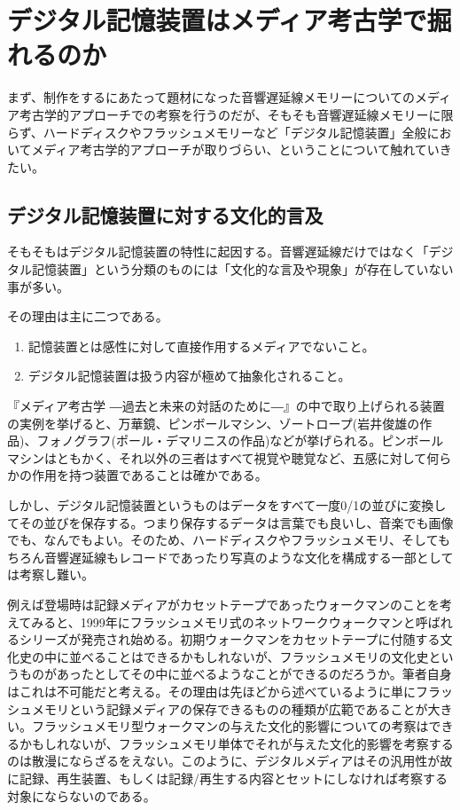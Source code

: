 \documentclass[a4paper,report]{jsbook}
\begin{document}
\section{デジタル記憶装置はメディア考古学で掘れるのか}\label{ux30c7ux30b8ux30bfux30ebux8a18ux61b6ux88c5ux7f6eux306fux30e1ux30c7ux30a3ux30a2ux8003ux53e4ux5b66ux3067ux6398ux308cux308bux306eux304b}

まず、制作をするにあたって題材になった音響遅延線メモリーについてのメディア考古学的アプローチでの考察を行うのだが、そもそも音響遅延線メモリーに限らず、ハードディスクやフラッシュメモリーなど「デジタル記憶装置」全般においてメディア考古学的アプローチが取りづらい、ということについて触れていきたい。

\subsection{デジタル記憶装置に対する文化的言及}\label{ux30c7ux30b8ux30bfux30ebux8a18ux61b6ux88c5ux7f6eux306bux5bfeux3059ux308bux6587ux5316ux7684ux8a00ux53ca}

そもそもはデジタル記憶装置の特性に起因する。音響遅延線だけではなく「デジタル記憶装置」という分類のものには「文化的な言及や現象」が存在していない事が多い。

その理由は主に二つである。

\begin{enumerate}
\def\labelenumi{\arabic{enumi}.}
\tightlist
\item
  記憶装置とは感性に対して直接作用するメディアでないこと。
\item
  デジタル記憶装置は扱う内容が極めて抽象化されること。
\end{enumerate}

『メディア考古学
―過去と未来の対話のために―』の中で取り上げられる装置の実例を挙げると、万華鏡、ピンボールマシン、ゾートロープ(岩井俊雄の作品)、フォノグラフ(ポール・デマリニスの作品)などが挙げられる。ピンボールマシンはともかく、それ以外の三者はすべて視覚や聴覚など、五感に対して何らかの作用を持つ装置であることは確かである。

しかし、デジタル記憶装置というものはデータをすべて一度0/1の並びに変換してその並びを保存する。つまり保存するデータは言葉でも良いし、音楽でも画像でも、なんでもよい。そのため、ハードディスクやフラッシュメモリ、そしてもちろん音響遅延線もレコードであったり写真のような文化を構成する一部としては考察し難い。

例えば登場時は記録メディアがカセットテープであったウォークマンのことを考えてみると、1999年にフラッシュメモリ式のネットワークウォークマンと呼ばれるシリーズが発売され始める。初期ウォークマンをカセットテープに付随する文化史の中に並べることはできるかもしれないが、フラッシュメモリの文化史というものがあったとしてその中に並べるようなことができるのだろうか。筆者自身はこれは不可能だと考える。その理由は先ほどから述べているように単にフラッシュメモリという記録メディアの保存できるものの種類が広範であることが大きい。フラッシュメモリ型ウォークマンの与えた文化的影響についての考察はできるかもしれないが、フラッシュメモリ単体でそれが与えた文化的影響を考察するのは散漫にならざるをえない。このように、デジタルメディアはその汎用性が故に記録、再生装置、もしくは記録/再生する内容とセットにしなければ考察する対象にならないのである。
\end{document}

